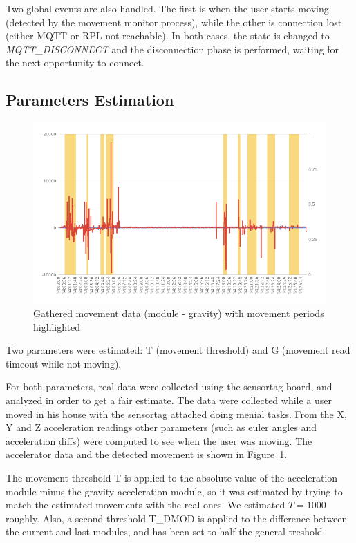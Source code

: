 \documentclass[a4paper, 11pt]{article}
\begin{document}
Two global events are also handled. The first is when the user starts moving (detected by the movement monitor process), while the other is connection lost (either MQTT or RPL not reachable). In both cases, the state is changed to \emph{MQTT\_DISCONNECT} and the disconnection phase is performed, waiting for the next opportunity to connect.

\subsection*{Parameters Estimation}

\begin{figure}[h]
\centering
    \includegraphics[width=0.7\linewidth]{images/accel_chart.png}
    \caption{Gathered movement data (module - gravity) with movement periods highlighted}
    \label{fig:accel_data}
\end{figure}

Two parameters were estimated: T (movement threshold) and G (movement read timeout while not moving).

For both parameters, real data were collected using the sensortag board, and analyzed in order to get a fair estimate.
The data were collected while a user moved in his house with the sensortag attached doing menial tasks.
From the X, Y and Z acceleration readings other parameters (such as euler angles and acceleration diffs) were computed to see when the user was moving.
The accelerator data and the detected movement is shown in Figure~\ref{fig:accel_data}.

The movement threshold T is applied to the absolute value of the acceleration module minus the gravity acceleration module, so it was estimated by trying to match the estimated movements with the real ones. We estimated $T = 1000$ roughly. Also, a second threshold T\_DMOD is applied to the difference between the current and last modules, and has been set to half the general treshold. 
\end{document}
